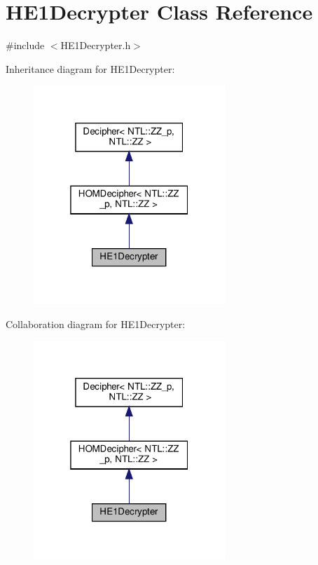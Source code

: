 \hypertarget{classHE1Decrypter}{}\section{H\+E1\+Decrypter Class Reference}
\label{classHE1Decrypter}


{\ttfamily \#include $<$H\+E1\+Decrypter.\+h$>$}



Inheritance diagram for H\+E1\+Decrypter\+:
\nopagebreak
\begin{figure}[H]
\begin{center}
\leavevmode
\includegraphics[width=205pt]{classHE1Decrypter__inherit__graph}
\end{center}
\end{figure}


Collaboration diagram for H\+E1\+Decrypter\+:
\nopagebreak
\begin{figure}[H]
\begin{center}
\leavevmode
\includegraphics[width=205pt]{classHE1Decrypter__coll__graph}
\end{center}
\end{figure}
